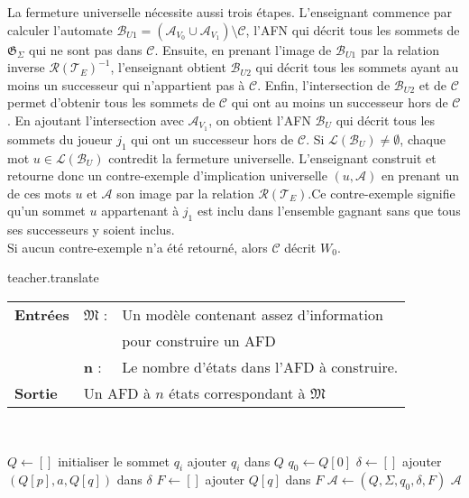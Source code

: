 \documentclass[12pt,a4paper,oneside,titlepage]{report}
\begin{document}
La fermeture universelle nécessite aussi trois étapes. L'enseignant commence par calculer l'automate $\mathcal{B}_{U1}=(\mathcal{A}_{V_0}\cup\mathcal{A}_{V_1})\setminus\mathcal{C}$, l'AFN qui décrit tous les sommets de $\mathfrak{G}_\Sigma$ qui ne sont pas dans $\mathcal{C}$. Ensuite, en prenant l'image de $\mathcal{B}_{U1}$ par la relation inverse $\mathcal{R}(\mathcal{T}_E)^{-1}$, l'enseignant obtient $\mathcal{B}_{U2}$ qui décrit tous les sommets ayant au moins un successeur qui n'appartient pas à $\mathcal{C}$. Enfin, l'intersection de $\mathcal{B}_{U2}$ et de $\mathcal{C}$ permet d'obtenir tous les sommets de $\mathcal{C}$ qui ont au moins un successeur hors de $\mathcal{C}$. En ajoutant l'intersection avec $\mathcal{A}_{V_1}$, on obtient l'AFN $\mathcal{B}_U$ qui décrit tous les sommets du joueur $j_1$ qui ont un successeur hors de $\mathcal{C}$. Si $\mathcal{L}(\mathcal{B}_U)\neq\emptyset$, chaque mot $u\in\mathcal{L}(\mathcal{B}_U)$ contredit la fermeture universelle. L'enseignant construit et retourne donc un contre-exemple d'implication universelle $(u,\mathcal{A})$ en prenant un de ces mots $u$ et $\mathcal{A}$ son image par la relation $\mathcal{R}(\mathcal{T}_E)$.Ce contre-exemple signifie qu'un sommet $u$ appartenant à $j_1$ est inclu dans l'ensemble gagnant sans que tous ses successeurs y soient inclus.\\

\noindent Si aucun contre-exemple n'a été retourné, alors $\mathcal{C}$ décrit $W_0$.

\begin{algorithm}[H]
\caption{teacher.translate}\label{alginfinitetranslate}
\hspace*{\algorithmicindent} 
\begin{tabular}{lll}
	\textbf{Entrées} & \textbf{$\mathfrak{M}$} : &Un modèle contenant assez d'information\\
	&&pour construire un AFD\\
	&\textbf{n} :&Le nombre d'états dans l'AFD à construire.\\
	\textbf{Sortie} &\multicolumn{2}{l}{Un AFD à $n$ états correspondant à $\mathfrak{M}$}\\
\end{tabular}\\
\begin{algorithmic}[1]
\State $Q\gets[]$
	\State initialiser le sommet $q_i$
	\State ajouter $q_i$ dans $Q$
\EndFor
\State $q_0\gets Q[0]$
\State $\delta\gets[]$
		\State ajouter $(Q[p],a,Q[q])$ dans $\delta$
	\EndIf
\EndFor
\State $F\gets[]$
		\State ajouter $Q[q]$ dans $F$
	\EndIf
\EndFor
\State $\mathcal{A}\gets(Q,\Sigma,q_0,\delta,F)$
\State\Return $\mathcal{A}$
\end{algorithmic}
\end{algorithm}
\end{document}
